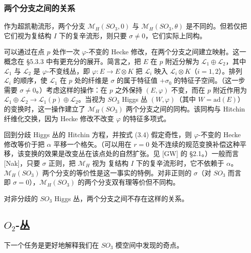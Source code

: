 \subsubsection{两个分支之间的关系}

作为超凯勒流形，两个分支 $\mathcal{M}_H(SO_3,0)$ 与 $\mathcal{M}_H(SO_3,\theta)$ 是不同的。但若仅把它们视为复结构 $I$ 下的复辛流形，则只要 $\sigma\ne0$，它们实际上同构。

可以通过在点 $p$ 处作一次 $\varphi$-不变的 Hecke 修改，在两个分支之间建立映射。这一概念在 §5.3.3 中有更充分的展开。简言之，把 $E$ 在 $p$ 附近分解为 $\mathcal{L}_1\oplus\mathcal{L}_2$，其中 $\mathcal{L}_1$ 与 $\mathcal{L}_2$ 是 $\varphi$-不变线丛，即 $\varphi:E\to E\otimes K$ 把 $\mathcal{L}_i$ 映入 $\mathcal{L}_i\otimes K$（$i=1,2$）。排列 $\mathcal{L}_i$ 的顺序，使 $\mathcal{L}_1$ 在 $p$ 处的纤维是 $\sigma$ 的属于特征值 $+\sigma_0$ 的特征子空间。（这一步需要 $\sigma\ne0$。）考虑这样的操作：在 $p$ 之外保持 $(E,\varphi)$ 不变，而在 $p$ 附近作用为 $\mathcal{L}_1\oplus\mathcal{L}_2\to\mathcal{L}_1(p)\oplus\mathcal{L}_2$。当视为 $SO_3$ Higgs 丛 $(W,\varphi)$（其中 $W=\mathrm{ad}(E)$）的变换时，这一操作建立了 $\mathcal{M}_H(SO_3)$ 两个分支之间的同构。该同构与 Hitchin 纤维化交换，因为 Hecke 修改不改变 $\varphi$ 的特征多项式。

回到分歧 Higgs 丛的 Hitchin 方程，并按式 (3.4) 假定奇性，则 $\varphi$-不变的 Hecke 修改等价于把 $\alpha$ 平移一个格矢。（可以用在 $r=0$ 处不连续的规范变换补偿这种平移，该变换的效果是改变丛在该点处的自然扩张。见 [GW] 的 §2.1。）一般而言 [Nak]，只要 $\sigma$ 正则，把 $\mathcal{M}_H$ 视为
复结构 $I$ 下的复辛流形时，它不依赖于 $\alpha$。$\mathcal{M}_H(SO_3)$ 两个分支的等价性是这一事实的特例。对非正则的 $\sigma$（对 $SO_3$ 而言即 $\sigma=0$），$\mathcal{M}_H(SO_3)$ 的两个分支双有理等价但不同构。

对非分歧的 $SO_3$ Higgs 丛，两个分支之间不存在这样的关系。

\subsection{\texorpdfstring{$O_2$}{O2}-丛}

下一个任务是更好地解释我们在 $SO_3$ 模空间中发现的奇点。

